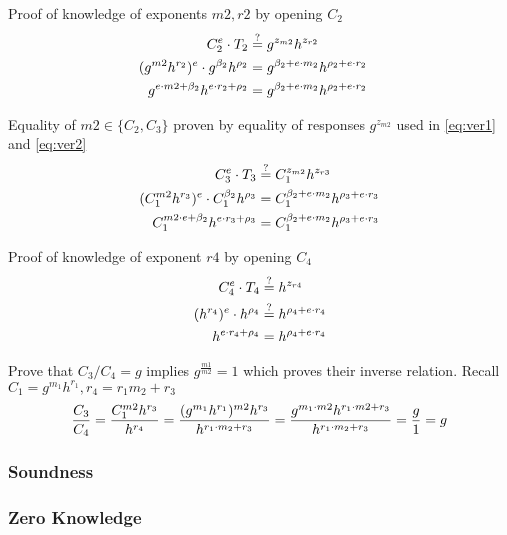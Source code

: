 Proof of knowledge of exponents $m2, r2$ by opening $C_2$ 
\begin{align}
    C_2^e \cdot T_2 &\stackrel{?}{=} g^{z_{m2}} h^{z_{r2}} && \label{eq:ver1} \\
    (g^{m2}h^{r_2})^e \cdot g^{\beta_2}h^{\rho_2} &= g^{\beta_2 + e \cdot m_2} h^{\rho_2 + e \cdot r_2} \notag \\
    g^{e \cdot m2 + \beta_2}h^{e \cdot r_2 + \rho_2} &= g^{\beta_2 + e \cdot m_2} h^{\rho_2 + e \cdot r_2} \notag 
\end{align}


Equality of $m2 \in \{C_2, C_3\}$ proven by equality of responses $g^{z_{m2}}$ used in \eqref{eq:ver1} and \eqref{eq:ver2}
\begin{align}
    C_3^e \cdot T_3 &\stackrel{?}{=} C_1^{z_{m2}} h^{z_{r3}} \notag \\
    (C_1^{m2}h^{r_3})^e \cdot C_1^{\beta_2}h^{\rho_3} &= C_1^{\beta_2 + e \cdot m_2} h^{\rho_3 + e \cdot r_3} \label{eq:ver2} \\
    C_1^{m2 \cdot e + \beta_2}h^{e \cdot r_3 + \rho_3} &= C_1^{\beta_2 + e \cdot m_2} h^{\rho_3 + e \cdot r_3} \notag
\end{align}

Proof of knowledge of exponent $r4$ by opening $C_4$ 
\begin{align}
    C_4^e \cdot T_4 &\stackrel{?}{=} h^{z_{r4}} \notag \\
    (h^{r_4})^e \cdot h^{\rho_4} &\stackrel{?}{=} h^{\rho_4 + e \cdot r_4} \notag \\
    h^{e \cdot r_4 + \rho_4} &= h^{\rho_4 + e \cdot r_4} \notag
\end{align}

Prove that $C_3/C_4 = g$ implies $g^{\frac{m1}{m2}} = 1$ which proves their inverse relation. Recall $C_1 = g^{m_1}h^{r_1}, r_4 = r_1m_2 + r_3$
\begin{align}
    \dfrac{C_3}{C_4} = \dfrac{C_1^{m2}h^{r_3}}{h^{r_4}} = \dfrac{(g^{m_1}h^{r_1})^{m2}h^{r_3}}{h^{r_1 \cdot m_2 + r_3}} = \dfrac{g^{m_1\cdot m2}h^{r_1\cdot m2 + r_3}}{h^{r_1 \cdot m_2 + r_3}} = \dfrac{g}{1} = g \notag \\
\end{align}

\subsubsection{Soundness}

\subsubsection{Zero Knowledge}

